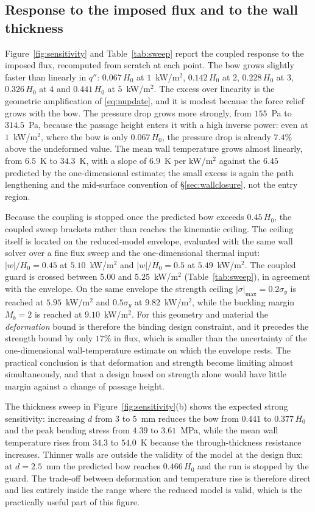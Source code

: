 \documentclass[11pt,a4paper]{article}
\begin{document}
\subsection{Response to the imposed flux and to the wall thickness}
\label{sec:sensitivity}

Figure~\ref{fig:sensitivity} and Table~\ref{tab:sweep} report the coupled
response to the imposed flux, recomputed from scratch at each point. The bow
grows slightly faster than linearly in $q''$: $0.067\,H_0$ at
$1$~kW/m$^2$, $0.142\,H_0$ at $2$, $0.228\,H_0$ at $3$, $0.326\,H_0$ at $4$ and
$0.441\,H_0$ at $5$~kW/m$^2$. The excess over linearity is the geometric
amplification of \eqref{eq:nupdate}, and it is modest because the force relief
grows with the bow. The pressure drop grows more strongly, from $155$~Pa to
$314.5$~Pa, because the passage height enters it with a high inverse power:
even at $1$~kW/m$^2$, where the bow is only $0.067\,H_0$, the pressure drop is
already $7.4\%$ above the undeformed value. The mean wall temperature grows
almost linearly, from $6.5$~K to $34.3$~K, with a slope of
$6.9$~K per kW/m$^2$ against the $6.45$ predicted by the one-dimensional
estimate; the small excess is again the path lengthening and the mid-surface
convention of \S\ref{sec:wallclosure}, not the entry region.

Because the coupling is stopped once the predicted bow exceeds $0.45\,H_0$,
the coupled sweep brackets rather than reaches the kinematic ceiling. The
ceiling itself is located on the reduced-model envelope, evaluated with the
same wall solver over a fine flux sweep and the one-dimensional thermal input:
$|w|/H_0=0.45$ at $5.10$~kW/m$^2$ and $|w|/H_0=0.5$ at $5.49$~kW/m$^2$. The
coupled guard is crossed between $5.00$ and $5.25$~kW/m$^2$
(Table~\ref{tab:sweep}), in agreement with the envelope. On the same envelope
the strength ceiling $|\sigma|_{\max}=0.2\sigma_y$ is reached at
$5.95$~kW/m$^2$ and $0.5\sigma_y$ at $9.82$~kW/m$^2$, while the buckling
margin $M_b=2$ is reached at $9.10$~kW/m$^2$. For this geometry and material
the \emph{deformation} bound is therefore the binding design constraint, and
it precedes the strength bound by only $17\%$ in flux, which is smaller than
the uncertainty of the one-dimensional wall-temperature estimate on which the
envelope rests. The practical conclusion is that deformation and strength
become limiting almost simultaneously, and that a design based on strength
alone would have little margin against a change of passage height.

The thickness sweep in Figure~\ref{fig:sensitivity}(b) shows the expected
strong sensitivity: increasing $d$ from $3$ to $5$~mm reduces the bow from
$0.441$ to $0.377\,H_0$ and the peak bending stress from $4.39$ to
$3.61$~MPa, while the mean wall temperature rises from $34.3$ to $54.0$~K
because the through-thickness resistance increases. Thinner walls are outside
the validity of the model at the design flux: at $d=2.5$~mm the predicted bow
reaches $0.466\,H_0$ and the run is stopped by the guard. The trade-off
between deformation and temperature rise is therefore direct and lies entirely
inside the range where the reduced model is valid, which is the practically
useful part of this figure.
\end{document}
